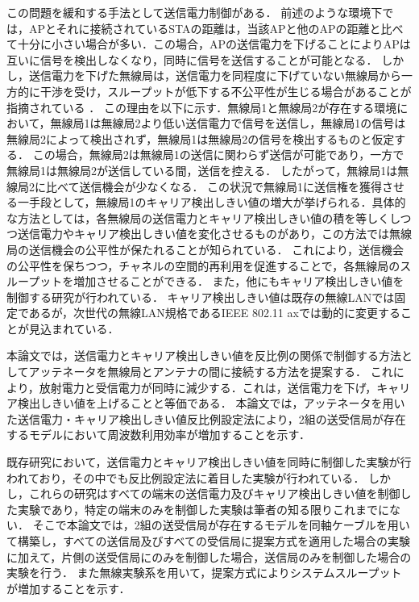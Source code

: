 \documentclass[master]{kuisthesis}		%
\begin{document}
この問題を緩和する手法として送信電力制御がある．
前述のような環境下では，APとそれに接続されているSTAの距離は，当該APと他のAPの距離と比べて十分に小さい場合が多い．この場合，APの送信電力を下げることによりAPは互いに信号を検出しなくなり，同時に信号を送信することが可能となる\cite{APowerControlMAC,Apowercontrolled,performance_enhancement,performance_evaluation}．
しかし，送信電力を下げた無線局は，送信電力を同程度に下げていない無線局から一方的に干渉を受け，スループットが低下する不公平性が生じる場合があることが指摘されている
\cite{InterferenceMitigation}．
この理由を以下に示す．無線局1と無線局2が存在する環境において，無線局1は無線局2より低い送信電力で信号を送信し，無線局1の信号は無線局2によって検出されず，無線局1は無線局2の信号を検出するものと仮定する．
この場合，無線局2は無線局1の送信に関わらず送信が可能であり，一方で無線局1は無線局2が送信している間，送信を控える．
したがって，無線局1は無線局2に比べて送信機会が少なくなる．
この状況で無線局1に送信権を獲得させる一手段として，無線局1のキャリア検出しきい値の増大が挙げられる．具体的な方法としては，各無線局の送信電力とキャリア検出しきい値の積を等しくしつつ送信電力やキャリア検出しきい値を変化させるものがあり，この方法では無線局の送信機会の公平性が保たれることが知られている\cite{InterferenceMitigation}．
これにより，送信機会の公平性を保ちつつ，チャネルの空間的再利用を促進することで，各無線局のスループットを増加させることができる．
また，他にもキャリア検出しきい値を制御する研究が行われている\cite{CSMA_self,centralized_control,tuning_the_carrier}．
キャリア検出しきい値は既存の無線LANでは固定であるが，次世代の無線LAN規格であるIEEE 802.11 axでは動的に変更することが見込まれている\cite{11ax_advanced_wireless,11ax_evaluation,11ax_next,analysis_of_the}．

本論文では，送信電力とキャリア検出しきい値を反比例の関係で制御する方法としてアッテネータを無線局とアンテナの間に接続する方法を提案する．
これにより，放射電力と受信電力が同時に減少する．これは，送信電力を下げ，キャリア検出しきい値を上げることと等価である．
本論文では，アッテネータを用いた送信電力・キャリア検出しきい値反比例設定法により，2組の送受信局が存在するモデルにおいて周波数利用効率が増加することを示す．

既存研究において，送信電力とキャリア検出しきい値を同時に制御した実験が行われており\cite{AdaptiveCSMAfor}，その中でも反比例設定法に着目した実験が行われている\cite{InterferenceMitigation}．
しかし，これらの研究はすべての端末の送信電力及びキャリア検出しきい値を制御した実験であり，特定の端末のみを制御した実験は筆者の知る限りこれまでにない．
そこで本論文では，2組の送受信局が存在するモデルを同軸ケーブルを用いて構築し，すべての送信局及びすべての受信局に提案方式を適用した場合の実験に加えて，片側の送受信局にのみを制御した場合，送信局のみを制御した場合の実験を行う．
また無線実験系を用いて，提案方式によりシステムスループットが増加することを示す．
\end{document}
